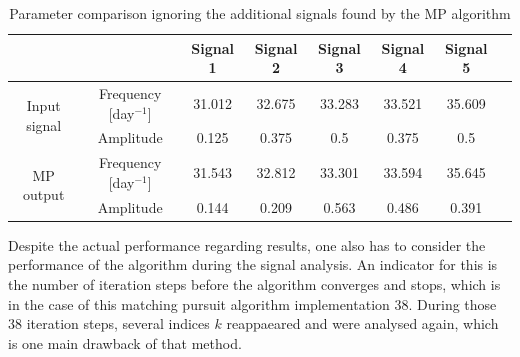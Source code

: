 \begin{table}[h!]
\centering
\begin{tabular}{ | c| c| c| c| c| c|c|c| }
\hline
	&   & Signal 1 & Signal 2 & Signal 3 & Signal 4 & Signal 5 \\ \hline
\multirow{2}{3cm}{Input signal} & Frequency [day$^{-1}$] & 31.012 & 32.675 & 33.283 & 33.521 & 35.609 \\ \cline{2-7}
 & Amplitude & 0.125 & 0.375 & 0.5 & 0.375 & 0.5 \\ \hline

\multirow{2}{3cm}{MP output} & Frequency [day$^{-1}$] &  31.543& 32.812 & 33.301 & 33.594 & 35.645 \\ \cline{2-7}
 & Amplitude &  0.144& 0.209& 0.563 & 0.486 & 0.391 \\ \hline

\end{tabular}
\caption{Parameter comparison ignoring the additional signals found by the MP algorithm}
\label{tab:mp}
\end{table}

Despite the actual performance regarding results, one also has to consider the performance of the algorithm during the signal analysis. An indicator for this is the number of iteration steps before the algorithm converges and stops, which is in the case of this matching pursuit algorithm implementation 38. During those 38 iteration steps, several indices $k$ reappaeared and were analysed again, which is one main drawback of that method.




